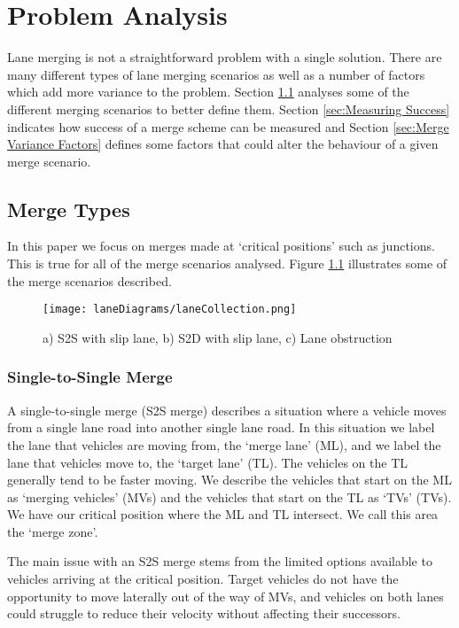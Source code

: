 \chapter{Problem Analysis}
\label{cha:Problem Analysis}
Lane merging is not a straightforward problem with a single solution. There are many different types of lane merging scenarios as well as a number of factors which add more variance to the problem. Section \ref{sec:Merge Types} analyses some of the different merging scenarios to better define them. Section \ref{sec:Measuring Success} indicates how success of a merge scheme can be measured and Section \ref{sec:Merge Variance Factors} defines some factors that could alter the behaviour of a given merge scenario.

\section{Merge Types}
\label{sec:Merge Types}
In this paper we focus on merges made at `critical positions' such as junctions. This is true for all of the merge scenarios analysed. Figure \ref{fig:laneCollection} illustrates some of the merge scenarios described.

\begin{figure}
\centerline{
\texttt{[image: laneDiagrams/laneCollection.png]}
}
\caption{a) S2S with slip lane, b) S2D with slip lane, c) Lane obstruction}
\label{fig:laneCollection}
\end{figure}

\subsection{Single-to-Single Merge}
\label{subsec:Single-to-Single Merge}
A single-to-single merge (S2S merge) describes a situation where a vehicle moves from a single lane road into another single lane road. In this situation we label the lane that vehicles are moving from, the `merge lane' (ML), and we label the lane that vehicles move to, the `target lane' (TL). The vehicles on the TL generally tend to be faster moving. We describe the vehicles that start on the ML as `merging vehicles' (MVs) and the vehicles that start on the TL as `TVs' (TVs). We have our critical position where the ML and TL intersect. We call this area the `merge zone'.

The main issue with an S2S merge stems from the limited options available to vehicles arriving at the critical position. Target vehicles do not have the opportunity to move laterally out of the way of MVs, and vehicles on both lanes could struggle to reduce their velocity without affecting their successors.

